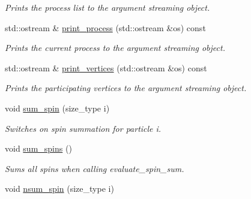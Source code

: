 \begin{DoxyCompactItemize}
\begin{DoxyCompactList}\small\item\em Prints the process list to the argument streaming object. \end{DoxyCompactList}\item 
\hypertarget{a00070_adee5560e371f72c271fca2297ec856b9}{std\-::ostream \& \hyperlink{a00070_adee5560e371f72c271fca2297ec856b9}{print\-\_\-process} (std\-::ostream \&os) const }\label{a00070_adee5560e371f72c271fca2297ec856b9}

\begin{DoxyCompactList}\small\item\em Prints the current process to the argument streaming object. \end{DoxyCompactList}\item 
\hypertarget{a00070_ad6c31ec843cc98a64213f0ec470c9326}{std\-::ostream \& \hyperlink{a00070_ad6c31ec843cc98a64213f0ec470c9326}{print\-\_\-vertices} (std\-::ostream \&os) const }\label{a00070_ad6c31ec843cc98a64213f0ec470c9326}

\begin{DoxyCompactList}\small\item\em Prints the participating vertices to the argument streaming object. \end{DoxyCompactList}\item 
\hypertarget{a00070_acb71ec573b3a5d47ceeb3355e99ce33f}{void \hyperlink{a00070_acb71ec573b3a5d47ceeb3355e99ce33f}{sum\-\_\-spin} (size\-\_\-type i)}\label{a00070_acb71ec573b3a5d47ceeb3355e99ce33f}

\begin{DoxyCompactList}\small\item\em Switches on spin summation for particle i. \end{DoxyCompactList}\item 
\hypertarget{a00070_afb83877c21aafd2895eea5c4a058f132}{void \hyperlink{a00070_afb83877c21aafd2895eea5c4a058f132}{sum\-\_\-spins} ()}\label{a00070_afb83877c21aafd2895eea5c4a058f132}

\begin{DoxyCompactList}\small\item\em Sums all spins when calling evaluate\-\_\-spin\-\_\-sum. \end{DoxyCompactList}\item 
\hypertarget{a00070_a95abb5d5bafbe2d8b2c96e8c01efd6c9}{void \hyperlink{a00070_a95abb5d5bafbe2d8b2c96e8c01efd6c9}{nsum\-\_\-spin} (size\-\_\-type i)}\label{a00070_a95abb5d5bafbe2d8b2c96e8c01efd6c9}


\end{DoxyCompactItemize}
